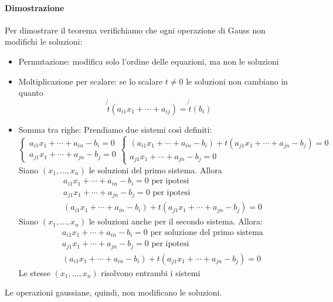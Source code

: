 \documentclass[a4paper,12pt,oneside]{article}
\begin{document}
\paragraph{Dimostrazione} Per dimostrare il teorema verifichiamo che ogni
operazione di Gauss non modifichi le soluzioni:
\begin{itemize}
    \item Permutazione: modifica solo l'ordine delle equazioni, ma non le soluzioni
    \item Moltiplicazione per scalare: se lo scalare $t \neq 0$ le soluzioni non
        cambiano in quanto
        \[\not{t}(a_{i1}x_1 + \cdots + a_{ij}) = \not{t}(b_i)\]
    \item Somma tra righe: Prendiamo due sistemi così definiti:
        \[
            \begin{cases}
                a_{i1}x_1 + \cdots + a_{in} - b_i = 0 \\
                a_{j1}x_1 + \cdots + a_{jn} - b_j = 0
            \end{cases}
            \begin{cases}
                (a_{i1}x_1 + \cdots + a_{in} - b_i) + t(a_{j1}x_1 + \cdots + a_{jn} - b_j) = 0 \\
                a_{j1}x_1 + \cdots + a_{jn} - b_j = 0
            \end{cases}
        \]
        Siano $(x_1, \ldots, x_n)$ le soluzioni del primo sistema. Allora
        \begin{align*}
            &a_{i1}x_1 + \cdots + a_{in} - b_i = 0 \text{ per ipotesi}\\
            &a_{j1}x_1 + \cdots + a_{jn} - b_j = 0 \text{ per ipotesi}\\
            &(a_{i1}x_1 + \cdots + a_{in} - b_i) + t(a_{j1}x_1 + \cdots + a_{jn} - b_j) = 0
        \end{align*}
        Siano $(x_1, \ldots, x_n)$ le soluzioni anche per il secondo sistema.
        Allora:
        \begin{align*}
            &a_{i1}x_1 + \cdots + a_{in} - b_i = 0 \text{ per soluzione del primo sistema}\\
            &a_{j1}x_1 + \cdots + a_{jn} - b_j = 0 \text{ per ipotesi}\\
            &(a_{i1}x_1 + \cdots + a_{in} - b_i) + t(a_{j1}x_1 + \cdots + a_{jn} - b_j) = 0
        \end{align*}
        Le stesse $(x_1, \ldots, x_n)$ risolvono entrambi i sistemi
\end{itemize}
Le operazioni gaussiane, quindi, non modificano le soluzioni.
\end{document}
